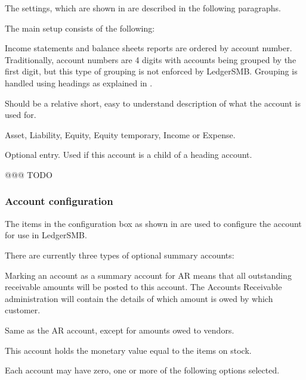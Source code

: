 The settings, which are shown in  are described in the following paragraphs.

The main setup consists of the following:

\begin{description}[style=nextline]
    \item[Account Number] Income statements and balance sheets reports are ordered by account number. Traditionally, account numbers are 4 digits with accounts being grouped by the first digit, but this type of grouping is not enforced by LedgerSMB. Grouping is handled using headings as explained in .
    \item[Description] Should be a relative short, easy to understand description of what the account is used for.
    \item[Account Type] Asset, Liability, Equity, Equity temporary, Income or Expense.
    \item[Heading] Optional entry. Used if this account is a child of a heading account.
    \item[Negative balance heading] @@@ TODO
\end{description}

\subsubsection{Account configuration}
\label{subsec-coa-account-configuration}

The items in the configuration box as shown in  are used to configure the account for use in LedgerSMB.

There are currently three types of optional summary accounts:

\begin{description}[style=nextline]
    \item [AR] Marking an account as a summary account for AR means that all outstanding
    receivable amounts will be posted to this account. The Accounts Receivable administration
    will contain the details of which amount is owed by which \gls{customer}.
    \item [AP] Same as the AR account, except for amounts owed to vendors.
    \item [Inventory] This account holds the monetary value equal to the items on stock.
\end{description}

Each account may have zero, one or more of the following options selected.

